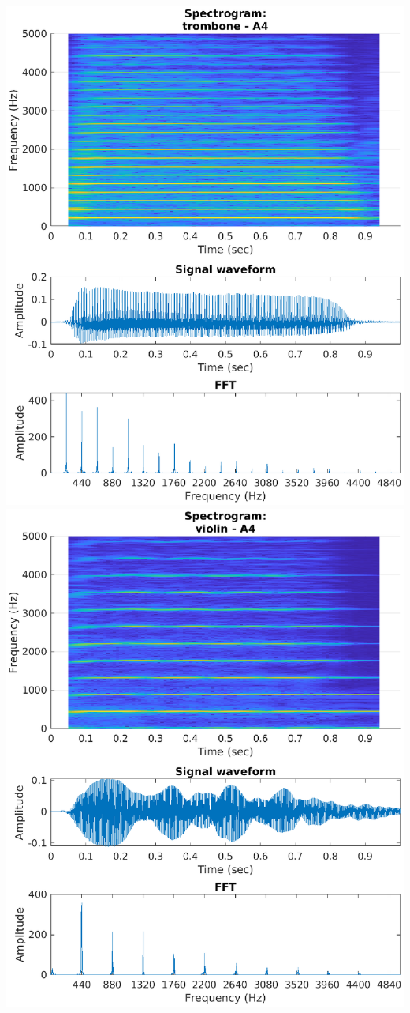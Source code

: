 \documentclass[aspectratio=1610]{beamer}
\begin{document}
\begin{frame}
\href{./Audio/trombone_A4_normal.mp3}{\includegraphics[height = .55\textheight]{spectrogram_trombone_normal}}
\href{./Audio/violin_A4_normal.mp3}{\includegraphics[height = .55\textheight]{spectrogram_violin_normal}}
\end{frame}
\end{document}
